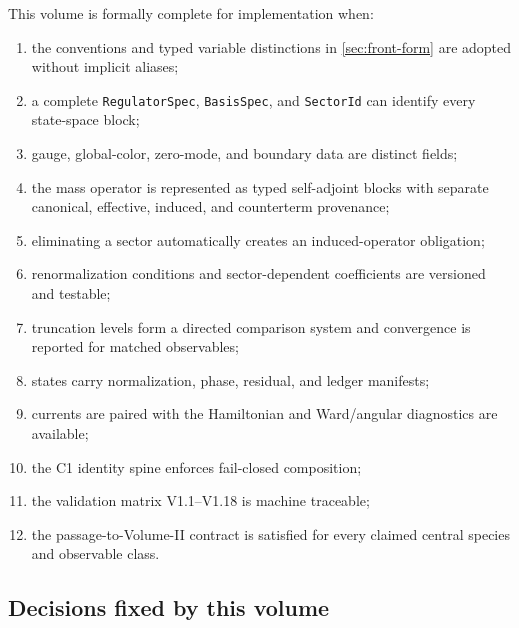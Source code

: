 \documentclass[11pt]{article}
\begin{document}
This volume is formally complete for implementation when:
\begin{enumerate}
\item the conventions and typed variable distinctions in
\cref{sec:front-form} are adopted without implicit aliases;
\item a complete \texttt{RegulatorSpec}, \texttt{BasisSpec}, and
\texttt{SectorId} can identify every state-space block;
\item gauge, global-color, zero-mode, and boundary data are distinct fields;
\item the mass operator is represented as typed self-adjoint blocks with
separate canonical, effective, induced, and counterterm provenance;
\item eliminating a sector automatically creates an induced-operator
obligation;
\item renormalization conditions and sector-dependent coefficients are
versioned and testable;
\item truncation levels form a directed comparison system and convergence is
reported for matched observables;
\item states carry normalization, phase, residual, and ledger manifests;
\item currents are paired with the Hamiltonian and Ward/angular diagnostics
are available;
\item the C1 identity spine enforces fail-closed composition;
\item the validation matrix V1.1--V1.18 is machine traceable;
\item the passage-to-Volume-II contract is satisfied for every claimed
central species and observable class.
\end{enumerate}

\subsection{Decisions fixed by this volume}
\end{document}
